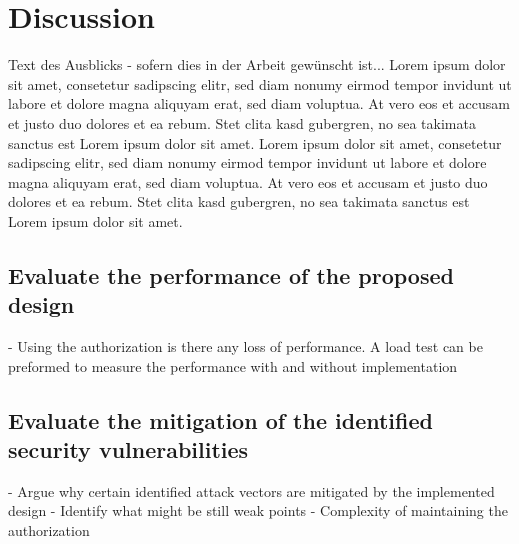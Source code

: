 \section{Discussion}\label{discussion}

Text des Ausblicks - sofern dies in der Arbeit gewünscht ist... Lorem ipsum dolor sit amet, consetetur sadipscing elitr, sed diam nonumy eirmod tempor invidunt ut labore et dolore magna aliquyam erat, sed diam voluptua. At vero eos et accusam et justo duo dolores et ea rebum. Stet clita kasd gubergren, no sea takimata sanctus est Lorem ipsum dolor sit amet. Lorem ipsum dolor sit amet, consetetur sadipscing elitr, sed diam nonumy eirmod tempor invidunt ut labore et dolore magna aliquyam erat, sed diam voluptua. At vero eos et accusam et justo duo dolores et ea rebum. Stet clita kasd gubergren, no sea takimata sanctus est Lorem ipsum dolor sit amet.

\subsection{Evaluate the performance of the proposed design}\label{evaluatePerformance}
- Using the authorization is there any loss of performance. A load test can be preformed to measure
the performance with and without implementation

\subsection{Evaluate the mitigation of the identified security vulnerabilities}\label{mitigation}

- Argue why certain identified attack vectors are mitigated by the implemented design
- Identify what might be still weak points
- Complexity of maintaining the authorization